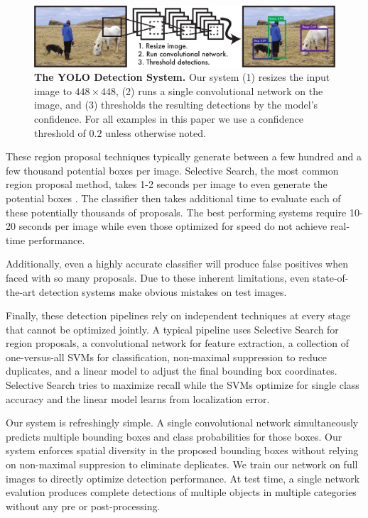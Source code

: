 \documentclass{article} %
\begin{document}
\begin{figure}[t]
\begin{center}
        \includegraphics[width=\linewidth]{system2}
\end{center}
   \caption{\textbf{The YOLO Detection System.} Our system (1) resizes the input image to $448 \times 448$, (2) runs a single convolutional network on the image, and (3) thresholds the resulting detections by the model's confidence. For all examples in this paper we use a confidence threshold of $0.2$ unless otherwise noted.}
\label{system}
\end{figure}

These region proposal techniques typically generate between a few hundred and a few thousand potential boxes per image. Selective Search, the most common region proposal method, takes 1-2 seconds per image to even generate the potential boxes \cite{uijlings2013selective}. The classifier then takes additional time to evaluate each of these potentially thousands of proposals. The best performing systems require 10-20 seconds per image while even those optimized for speed do not achieve real-time performance.

Additionally, even a highly accurate classifier will produce false positives when faced with so many proposals. Due to these inherent limitations, even state-of-the-art detection systems make obvious mistakes on test images.

Finally, these detection pipelines rely on independent techniques at every stage that cannot be optimized jointly. A typical pipeline uses Selective Search for region proposals, a convolutional network for feature extraction, a collection of one-versus-all SVMs for classification, non-maximal suppression to reduce duplicates, and a linear model to adjust the final bounding box coordinates. Selective Search tries to maximize recall while the SVMs optimize for single class accuracy and the linear model learns from localization error.

Our system is refreshingly simple. A single convolutional network simultaneously predicts multiple bounding boxes and class probabilities for those boxes. Our system enforces spatial diversity in the proposed bounding boxes without relying on non-maximal suppresion to eliminate deplicates. We train our network on full images to directly optimize detection performance. At test time, a single network evalution produces complete detections of multiple objects in multiple categories without any pre or post-processing.
\end{document}
